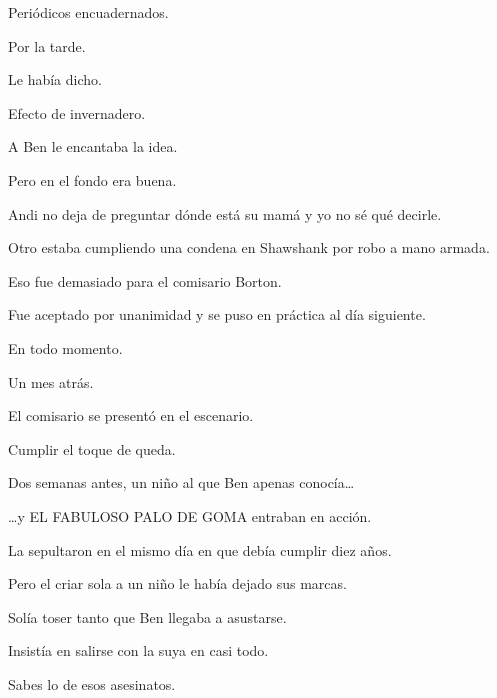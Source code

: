 \sk
Periódicos encuadernados. 

\sk
Por la tarde. 

\sk
Le había dicho. 

\sk
Efecto de invernadero. 

\sk
A Ben le encantaba la idea.\nb{}

\sk
Pero en el fondo era buena. 

\sk
Andi no deja de preguntar dónde está su mamá y
yo no sé qué decirle. 

\sk
Otro estaba cumpliendo
una condena en Shawshank por robo a mano armada.

\sk
Eso fue demasiado para el comisario Borton. 

\sk
Fue aceptado por
unanimidad y se puso en práctica al día siguiente.

\sk
En todo momento. 

\sk
Un mes atrás. 

\sk
El comisario se presentó en el escenario. 

\sk
Cumplir el toque de queda. 

\sk
Dos semanas antes, un niño al que Ben apenas
conocía\ldots{} 

\sk
\ldots{}y EL FABULOSO PALO DE GOMA entraban en acción. 

\sk
La sepultaron en el mismo día en que
debía cumplir diez años.

\sk
Pero el criar sola a un niño le había dejado sus marcas.

\sk
Solía toser tanto que Ben llegaba a asustarse.

\sk
Insistía en salirse con la suya en casi
todo. 

\sk
Sabes lo de esos asesinatos. 

